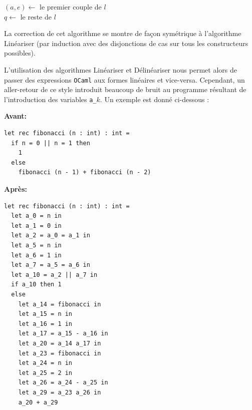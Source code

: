 \begin{algorithm}[H]
    \caption{Délinéariser}

    $(a, e) \leftarrow$ le premier couple de $l$ \\
    $q \leftarrow$ le reste de $l$


    \bigskip

\end{algorithm}

La correction de cet algorithme se montre de façon symétrique à l'algorithme
Linéariser (par induction avec des disjonctions de cas sur tous les
constructeurs possibles).

\bigbreak

L'utilisation des algorithmes Linéariser et Délinéariser nous permet alors de
passer des expressions \texttt{OCaml} aux formes linéaires et vice-versa.
Cependant, un aller-retour de ce style introduit beaucoup de bruit au programme
résultant de l'introduction des variables \texttt{a\_}$k$. Un exemple est donné
ci-dessous :

\bigskip

\noindent\textbf{Avant:}
\begin{verbatim}
let rec fibonacci (n : int) : int =
  if n = 0 || n = 1 then
    1
  else
    fibonacci (n - 1) + fibonacci (n - 2)
\end{verbatim}


\noindent\textbf{Après:}
\begin{verbatim}
let rec fibonacci (n : int) : int =
  let a_0 = n in
  let a_1 = 0 in
  let a_2 = a_0 = a_1 in
  let a_5 = n in
  let a_6 = 1 in
  let a_7 = a_5 = a_6 in
  let a_10 = a_2 || a_7 in
  if a_10 then 1
  else
    let a_14 = fibonacci in
    let a_15 = n in
    let a_16 = 1 in
    let a_17 = a_15 - a_16 in
    let a_20 = a_14 a_17 in
    let a_23 = fibonacci in
    let a_24 = n in
    let a_25 = 2 in
    let a_26 = a_24 - a_25 in
    let a_29 = a_23 a_26 in
    a_20 + a_29
\end{verbatim}

